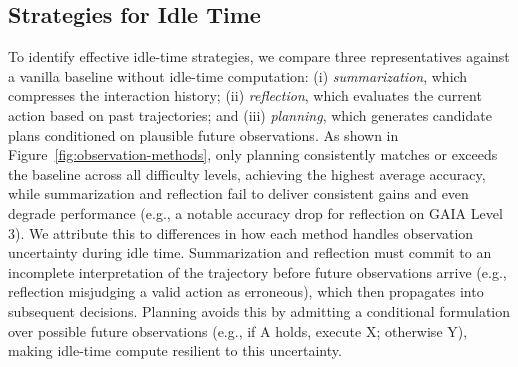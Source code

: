 \subsection{Strategies for Idle Time}\label{subsec:obs2}
To identify effective idle-time strategies, we compare three representatives against a vanilla baseline without idle-time computation:
(i) \textit{summarization}, which compresses the interaction history;
(ii) \textit{reflection}, which evaluates the current action based on past trajectories; and
(iii) \textit{planning}, which generates candidate plans conditioned on plausible future observations.
As shown in Figure~\ref{fig:observation-methods}, only planning consistently matches or exceeds the baseline across all difficulty levels, achieving the highest average accuracy, while summarization and reflection fail to deliver consistent gains and even degrade performance (e.g., a notable accuracy drop for reflection on GAIA Level 3).
We attribute this to differences in how each method handles observation uncertainty during idle time. Summarization and reflection must commit to an incomplete interpretation of the trajectory before future observations arrive (e.g., reflection misjudging a valid action as erroneous), which then propagates into subsequent decisions. Planning avoids this by admitting a conditional formulation over possible future observations (e.g., if A holds, execute X; otherwise Y), making idle-time compute resilient to this uncertainty.
